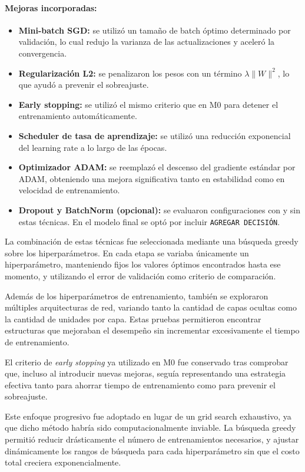 \documentclass[11pt]{article}
\begin{document}
\paragraph{Mejoras incorporadas:}
\begin{itemize}
    \item \textbf{Mini-batch SGD:} se utilizó un tamaño de batch óptimo determinado por validación, lo cual redujo la varianza de las actualizaciones y aceleró la convergencia.
    \item \textbf{Regularización L2:} se penalizaron los pesos con un término \( \lambda \| W \|^2 \), lo que ayudó a prevenir el sobreajuste.
    \item \textbf{Early stopping:} se utilizó el mismo criterio que en M0 para detener el entrenamiento automáticamente.
    \item \textbf{Scheduler de tasa de aprendizaje:} se utilizó una reducción exponencial del learning rate a lo largo de las épocas.
    \item \textbf{Optimizador ADAM:} se reemplazó el descenso del gradiente estándar por ADAM, obteniendo una mejora significativa tanto en estabilidad como en velocidad de entrenamiento.
    \item \textbf{Dropout y BatchNorm (opcional):} se evaluaron configuraciones con y sin estas técnicas. En el modelo final se optó por incluir \texttt{AGREGAR DECISIÓN}.
\end{itemize}

La combinación de estas técnicas fue seleccionada mediante una búsqueda greedy sobre los hiperparámetros. En cada etapa se variaba únicamente un hiperparámetro, manteniendo fijos los valores óptimos encontrados hasta ese momento, y utilizando el error de validación como criterio de comparación.

Además de los hiperparámetros de entrenamiento, también se exploraron múltiples arquitecturas de red, variando tanto la cantidad de capas ocultas como la cantidad de unidades por capa. Estas pruebas permitieron encontrar estructuras que mejoraban el desempeño sin incrementar excesivamente el tiempo de entrenamiento.

El criterio de \textit{early stopping} ya utilizado en M0 fue conservado tras comprobar que, incluso al introducir nuevas mejoras, seguía representando una estrategia efectiva tanto para ahorrar tiempo de entrenamiento como para prevenir el sobreajuste.

Este enfoque progresivo fue adoptado en lugar de un grid search exhaustivo, ya que dicho método habría sido computacionalmente inviable. La búsqueda greedy permitió reducir drásticamente el número de entrenamientos necesarios, y ajustar dinámicamente los rangos de búsqueda para cada hiperparámetro sin que el costo total creciera exponencialmente.
\end{document}
